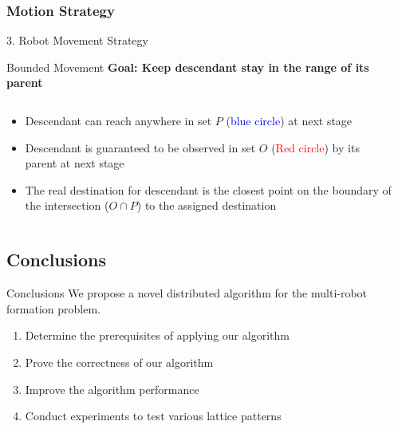 \documentclass[10pt]{beamer}
\begin{document}
\subsubsection[Algorithm: Motion]{Motion Strategy}
\begin{frame}{3. Robot Movement Strategy}{}
  
\end{frame}
\begin{frame}{Bounded Movement}{}
  \textbf{Goal: Keep descendant stay in the range of its parent}
    \begin{columns}[T] %
      \begin{column}{.5\textwidth}
        \begin{itemize}
        \item \small{Descendant can reach anywhere in set $P$
            (\textcolor{blue}{blue circle}) at next stage}
        \item \small{Descendant is guaranteed to be observed in set $O$
            (\textcolor{red}{Red circle}) by its parent at next stage}
        \item \small{The real destination for descendant is the closest point
            on the boundary of the intersection ($O\cap P$) to the
            assigned destination}
        \end{itemize}
      \end{column}%
      \begin{column}{.4\textwidth}
             
      \end{column}%
    \end{columns} 
\end{frame}




\subsection{Conclusions}
\begin{frame}{Conclusions}
  We propose a novel distributed algorithm for the multi-robot formation
  problem. 
  \begin{enumerate}
  \item Determine the prerequisites of applying our algorithm
  \item Prove the correctness of our algorithm 
  \item Improve the algorithm performance
  \item Conduct experiments to test various lattice patterns
  \end{enumerate}

\end{frame}
\end{document}
